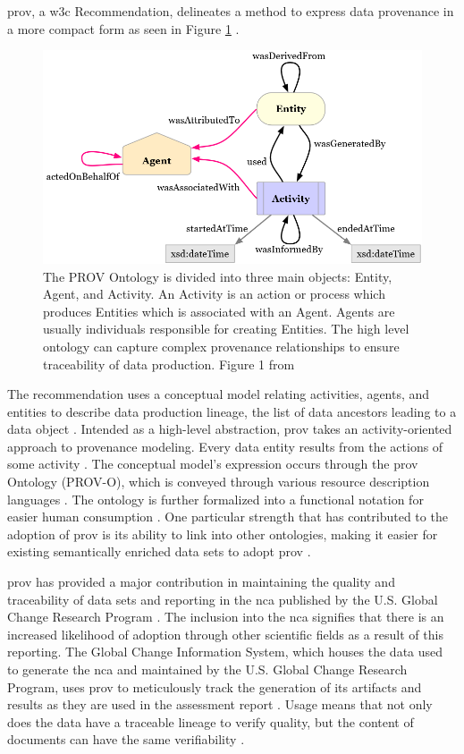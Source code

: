 \gls{prov}, a \gls{w3c} Recommendation, delineates a method to express data provenance in a more compact form as seen in Figure \ref{PROVO} \cite{Gil2013a} \cite{Groth2013}.
\begin{figure}
	\centering
	\includegraphics[scale=0.5]{figures/ProvO.png}
	\caption[Diagram of the PROV Ontology.]{The PROV Ontology is divided into three main objects: Entity, Agent, and Activity.  An Activity is an action or process which produces Entities which is associated with an Agent.  Agents are usually individuals responsible for creating Entities.  The high level ontology can capture complex provenance relationships to ensure traceability of data production.  Figure 1 from \cite{Lebo2013}}
	\label{PROVO}
\end{figure}
The recommendation uses a conceptual model relating activities, agents, and entities to describe data production lineage, the list of data ancestors leading to a data object \cite{Moreau2013c} \cite{Nies2013} \cite{Nies2013a}.
Intended as a high-level abstraction, \gls{prov} takes an activity-oriented approach to provenance modeling.
Every data entity results from the actions of some activity \cite{Gil2013}.
The conceptual model's expression occurs through the \gls{prov} Ontology (PROV-O), which is conveyed through various resource description languages \cite{Hua2013} \cite{Klyne2013}.
The ontology is further formalized into a functional notation for easier human consumption \cite{Moreau2013b} \cite{Cheney2013a}.
One particular strength that has contributed to the adoption of \gls{prov} is its ability to link into other ontologies, making it easier for existing semantically enriched data sets to adopt \gls{prov} \cite{Miles2013} \cite{Moreau2013}.

\gls{prov} has provided a major contribution in maintaining the quality and traceability of data sets and reporting in the \gls{nca} published by the U.S. Global Change Research Program \cite{Ma2014191}.
The inclusion into the \gls{nca} signifies that there is an increased likelihood of adoption through other scientific fields as a result of this reporting.
The Global Change Information System, which houses the data used to generate the \gls{nca} and maintained by the U.S. Global Change Research Program, uses \gls{prov} to meticulously track the generation of its artifacts and results as they are used in the assessment report \cite{Tilmes2012}.
Usage means that not only does the data have a traceable lineage to verify quality, but the content of documents can have the same verifiability \cite{Ma2014}.

